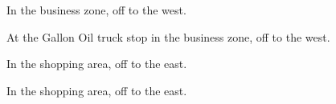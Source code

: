 

\begin{LocationList}

In the business zone, off   to the west.

At the Gallon Oil truck stop in the business zone, off   to the west.

\Location{\TruckService \Service \Rest}
In the shopping area, off   to the east.

In the shopping area, off   to the east.

\end{LocationList}
